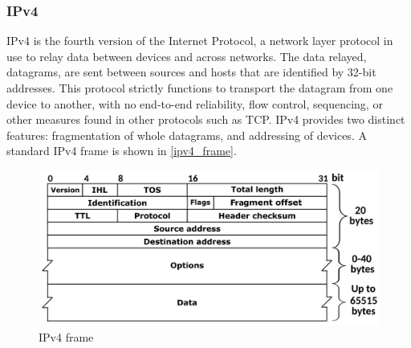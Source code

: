 \subsubsection{IPv4} IPv4 is the fourth version of the Internet Protocol, a network layer protocol in use to relay data between devices and across networks. The data relayed, datagrams, are sent between sources and hosts that are identified by 32-bit addresses. This protocol strictly functions to transport the datagram from one device to another, with no end-to-end reliability, flow control, sequencing, or other measures found in other protocols such as TCP. IPv4 provides two distinct features: fragmentation of whole datagrams, and addressing of devices. A standard IPv4 frame is shown in \autoref{ipv4_frame}.
\begin{figure}[H]
    \caption{IPv4 frame \cite{Postel1981}}
    \label{ipv4_frame}
    \centering
    \includegraphics[width=\textwidth]{images/ipv4_frame.png}
\end{figure}
